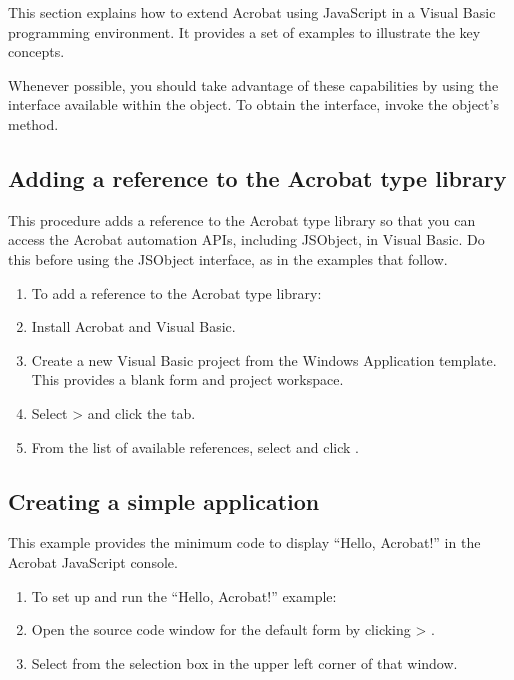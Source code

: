 \documentclass[letterpaper,12pt,english,openany,oneside]{sphinxmanual}
\begin{document}
This section explains how to extend Acrobat using JavaScript in a Visual Basic programming environment. It provides a set of examples to illustrate the key concepts.

Whenever possible, you should take advantage of these capabilities by using the  interface available within the  object. To obtain the interface, invoke the object’s  method.


\subsection{Adding a reference to the Acrobat type library}
\label{\detokenize{IAC_DevApp_OLE_Support:adding-a-reference-to-the-acrobat-type-library}}
This procedure adds a reference to the Acrobat type library so that you can access the Acrobat automation APIs, including JSObject, in Visual Basic. Do this before using the JSObject interface, as in the examples that follow.
\begin{enumerate}
%
\item {} 
To add a reference to the Acrobat type library:

\item {} 
Install Acrobat and Visual Basic.

\item {} 
Create a new Visual Basic project from the Windows Application template. This provides a blank form and project workspace.

\item {} 
Select  >  and click the  tab.

\item {} 
From the list of available references, select  and click  .

\end{enumerate}


\subsection{Creating a simple application}
\label{\detokenize{IAC_DevApp_OLE_Support:creating-a-simple-application}}
This example provides the minimum code to display “Hello, Acrobat!” in the Acrobat JavaScript console.
\begin{enumerate}
%
\item {} 
To set up and run the “Hello, Acrobat!” example:

\item {} 
Open the source code window for the default form by clicking  >  .

\item {} 
Select  from the selection box in the upper left corner of that window.

\end{enumerate}
\end{document}
